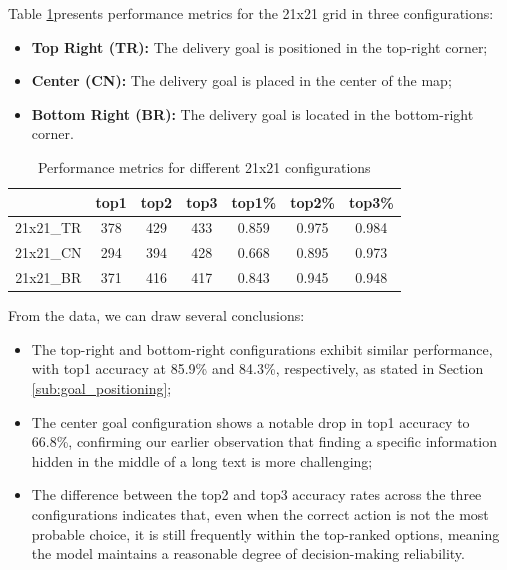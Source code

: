 Table \ref{tab:performance_21x21}presents performance metrics for the 21x21 grid
in three configurations:
\begin{itemize}
  \item \textbf{Top Right (TR):} The delivery goal is positioned in the top-right
    corner;

  \item \textbf{Center (CN):} The delivery goal is placed in the center of the
    map;

  \item \textbf{Bottom Right (BR):} The delivery goal is located in the bottom-right
    corner.
\end{itemize}

\begin{table}[h]
  \centering
  \begin{tabular}{c|ccc|ccc}
              & top1 & top2 & top3 & top1\% & top2\% & top3\% \\
    \hline
    21x21\_TR & 378  & 429  & 433  & 0.859  & 0.975  & 0.984  \\
    21x21\_CN & 294  & 394  & 428  & 0.668  & 0.895  & 0.973  \\
    21x21\_BR & 371  & 416  & 417  & 0.843  & 0.945  & 0.948  \\
  \end{tabular}
  \caption{Performance metrics for different 21x21 configurations}
  \label{tab:performance_21x21}
\end{table}

From the data, we can draw several conclusions:
\begin{itemize}
  \item The top-right and bottom-right configurations exhibit similar performance,
    with top1 accuracy at 85.9\% and 84.3\%, respectively, as stated in Section
    \ref{sub:goal_positioning};

  \item The center goal configuration shows a notable drop in top1 accuracy to 66.8\%,
    confirming our earlier observation that finding a specific information hidden
    in the middle of a long text is more challenging;

  \item The difference between the top2 and top3 accuracy rates across the three
    configurations indicates that, even when the correct action is not the most
    probable choice, it is still frequently within the top-ranked options,
    meaning the model maintains a reasonable degree of decision-making
    reliability.
\end{itemize}


